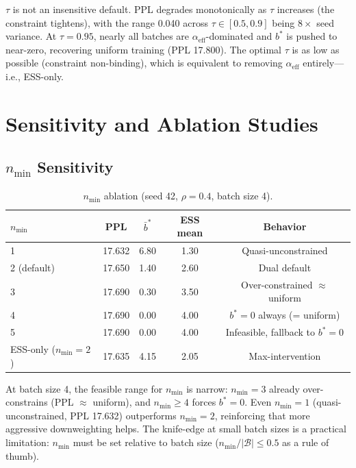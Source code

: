 \documentclass[11pt]{article}
\begin{document}
$\tau$ is not an insensitive default. PPL degrades monotonically as $\tau$ increases (the constraint tightens), with the range 0.040 across $\tau \in [0.5, 0.9]$ being $8\times$ seed variance. At $\tau = 0.95$, nearly all batches are $\alpha_{\mathrm{eff}}$-dominated and $b^*$ is pushed to near-zero, recovering uniform training (PPL 17.800). The optimal $\tau$ is as low as possible (constraint non-binding), which is equivalent to removing $\alpha_{\mathrm{eff}}$ entirely---i.e., ESS-only.

\section{Sensitivity and Ablation Studies}
\label{sec:sensitivity}

\subsection{$n_{\min}$ Sensitivity}

\begin{table}[h]
\centering
\caption{$n_{\min}$ ablation (seed 42, $\rho = 0.4$, batch size 4).}
\label{tab:nmin}
\begin{tabular}{lcccc}
\toprule
$n_{\min}$ & \textbf{PPL} & $\bar{b}^*$ & \textbf{ESS mean} & \textbf{Behavior} \\
\midrule
1 & 17.632 & 6.80 & 1.30 & Quasi-unconstrained \\
2 (default) & 17.650 & 1.40 & 2.60 & Dual default \\
3 & 17.690 & 0.30 & 3.50 & Over-constrained $\approx$ uniform \\
4 & 17.690 & 0.00 & 4.00 & $b^* = 0$ always (= uniform) \\
5 & 17.690 & 0.00 & 4.00 & Infeasible, fallback to $b^* = 0$ \\
ESS-only ($n_{\min} = 2$) & 17.635 & 4.15 & 2.05 & Max-intervention \\
\bottomrule
\end{tabular}
\end{table}

At batch size 4, the feasible range for $n_{\min}$ is narrow: $n_{\min} = 3$ already over-constrains (PPL $\approx$ uniform), and $n_{\min} \geq 4$ forces $b^* = 0$. Even $n_{\min} = 1$ (quasi-unconstrained, PPL 17.632) outperforms $n_{\min} = 2$, reinforcing that more aggressive downweighting helps. The knife-edge at small batch sizes is a practical limitation: $n_{\min}$ must be set relative to batch size ($n_{\min}/|\mathcal{B}| \leq 0.5$ as a rule of thumb).
\end{document}

